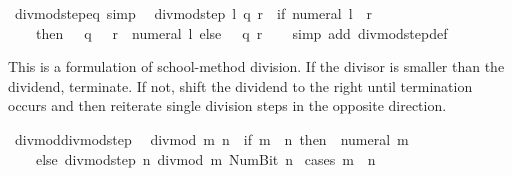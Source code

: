 \begin{isabellebody}
\isamarkupfalse%
\ divmod{\isacharunderscore}{\kern0pt}step{\isacharunderscore}{\kern0pt}eq\ {\isacharbrackleft}{\kern0pt}simp{\isacharbrackright}{\kern0pt}{\isacharcolon}{\kern0pt}\isanewline
\ \ {\isachardoublequoteopen}divmod{\isacharunderscore}{\kern0pt}step\ l\ {\isacharparenleft}{\kern0pt}q{\isacharcomma}{\kern0pt}\ r{\isacharparenright}{\kern0pt}\ {\isacharequal}{\kern0pt}\ {\isacharparenleft}{\kern0pt}if\ numeral\ l\ {\isasymle}\ r\isanewline
\ \ \ \ then\ {\isacharparenleft}{\kern0pt}{}\ {\isacharasterisk}{\kern0pt}\ q\ {\isacharplus}{\kern0pt}\ {}{\isacharcomma}{\kern0pt}\ r\ {\isacharminus}{\kern0pt}\ numeral\ l{\isacharparenright}{\kern0pt}\ else\ {\isacharparenleft}{\kern0pt}{}\ {\isacharasterisk}{\kern0pt}\ q{\isacharcomma}{\kern0pt}\ r{\isacharparenright}{\kern0pt}{\isacharparenright}{\kern0pt}{\isachardoublequoteclose}\isanewline
%
\isadelimproof
\ \ %
\endisadelimproof
%
\isatagproof
{}\isamarkupfalse%
\ {\isacharparenleft}{\kern0pt}simp\ add{\isacharcolon}{\kern0pt}\ divmod{\isacharunderscore}{\kern0pt}step{\isacharunderscore}{\kern0pt}def{\isacharparenright}{\kern0pt}%
\endisatagproof
{\isafoldproof}%
%
\isadelimproof
%
\endisadelimproof
%
\begin{isamarkuptext}%
This is a formulation of school-method division.
  If the divisor is smaller than the dividend, terminate.
  If not, shift the dividend to the right until termination
  occurs and then reiterate single division steps in the
  opposite direction.%
\end{isamarkuptext}\isamarkuptrue%
\isamarkupfalse%
\ divmod{\isacharunderscore}{\kern0pt}divmod{\isacharunderscore}{\kern0pt}step{\isacharcolon}{\kern0pt}\isanewline
\ \ {\isachardoublequoteopen}divmod\ m\ n\ {\isacharequal}{\kern0pt}\ {\isacharparenleft}{\kern0pt}if\ m\ {\isacharless}{\kern0pt}\ n\ then\ {\isacharparenleft}{\kern0pt}{}{\isacharcomma}{\kern0pt}\ numeral\ m{\isacharparenright}{\kern0pt}\isanewline
\ \ \ \ else\ divmod{\isacharunderscore}{\kern0pt}step\ n\ {\isacharparenleft}{\kern0pt}divmod\ m\ {\isacharparenleft}{\kern0pt}Num{\isachardot}{\kern0pt}Bit{}\ n{\isacharparenright}{\kern0pt}{\isacharparenright}{\kern0pt}{\isacharparenright}{\kern0pt}{\isachardoublequoteclose}\isanewline
%
\isadelimproof
%
\endisadelimproof
%
\isatagproof
{}\isamarkupfalse%
\ {\isacharparenleft}{\kern0pt}cases\ {\isachardoublequoteopen}m\ {\isacharless}{\kern0pt}\ n{\isachardoublequoteclose}{\isacharparenright}{\kern0pt}\isanewline
\ \ \isamarkupfalse%

\end{isabellebody}

